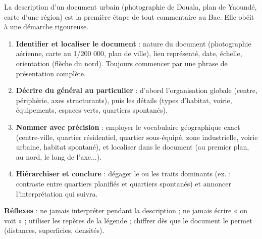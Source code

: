\documentclass[11pt]{article}
\newcommand{\cle}[1]{{\popxbold\color{popdark}#1}}
\begin{document}
\begin{methode}
La description d'un document urbain (photographie de Douala, plan de Yaoundé, carte d'une région) est la première étape de tout commentaire au Bac. Elle obéit à une démarche rigoureuse.
\begin{enumerate}
\item \textbf{Identifier et localiser le document} : nature du document (photographie aérienne, carte au 1/200 000, plan de ville), lieu représenté, date, échelle, orientation (flèche du nord). Toujours commencer par une phrase de présentation complète.
\item \textbf{Décrire du général au particulier} : d'abord l'organisation globale (centre, périphérie, axes structurants), puis les détails (types d'habitat, voirie, équipements, espaces verts, quartiers spontanés).
\item \textbf{Nommer avec précision} : employer le vocabulaire géographique exact (\cle{centre-ville}, \cle{quartier résidentiel}, \cle{quartier sous-équipé}, \cle{zone industrielle}, \cle{voirie urbaine}, \cle{habitat spontané}), et localiser dans le document (au premier plan, au nord, le long de l'axe...).
\item \textbf{Hiérarchiser et conclure} : dégager le ou les traits dominants (ex. : contraste entre quartiers planifiés et quartiers spontanés) et annoncer l'interprétation qui suivra.
\end{enumerate}
\textbf{Réflexes} : ne jamais interpréter pendant la description ; ne jamais écrire « on voit » ; utiliser les repères de la légende ; chiffrer dès que le document le permet (distances, superficies, densités).
\end{methode}
\end{document}
